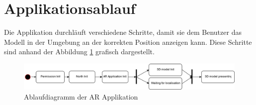 \documentclass[a4paper]{scrreprt}
\begin{document}
\section{Applikationsablauf}
Die Applikation durchläuft verschiedene Schritte, damit sie dem Benutzer das Modell in der Umgebung an der korrekten Position anzeigen kann. Diese Schritte sind anhand der Abbildung  \ref{fig:Ablaufdiagramm} grafisch dargestellt.

\begin{figure}[h!]
	\includegraphics[keepaspectratio, width=\textwidth]{AblaufdiagrammARApplikation.png}
	\caption{Ablaufdiagramm der AR Applikation}
    \label{fig:Ablaufdiagramm}
\end{figure}
\end{document}
